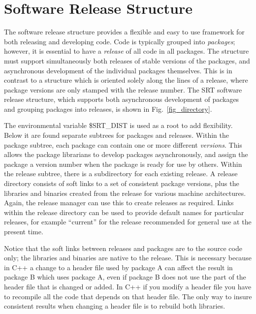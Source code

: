 \documentclass[12pt]{article}
\begin{document}
\section{Software Release Structure}
The software release structure provides a flexible and easy to use
framework for both releasing and developing code.  Code is typically grouped
into {\em packages}; however, it is essential to have a {\em release} of all 
code in 
all packages. The structure must support simultaneously both
releases of stable versions of the 
packages, and asynchronous development of 
the individual packages themselves.  This is in contrast to a structure which
is oriented solely along the lines of a release, where package versions
are only stamped with the release number. The SRT software release
structure, which supports both
asynchronous development of packages 
and grouping packages into releases,
is shown in Fig.~\ref{fig_directory}. 

The environmental variable {\ttfamily \$SRT\_DIST} is used as a root to add flexibility.  
Below it are found separate subtrees for packages and releases. 
Within the
package subtree, each package can contain one or more different {\em versions}.
This allows the package librarians to develop packages 
asynchronously,
and assign the package a version number when the package is ready for use
by others.  Within the release subtree, there is a subdirectory for each
existing release.  A release directory consists of soft links to a set of 
consistent package versions, plus the libraries and binaries created from
the release for various machine architectures.  Again, the release manager
can use this to create releases as required.  Links within the release
directory can be used to provide default names for particular releases, for
example ``current'' for the release recommended for general use at the present
time.

Notice that the soft links between releases and 
packages are
to the source code only; the libraries and binaries are native to the release.
This is necessary because in C++ a change to a header file used by package A can
affect the result in package B which uses package A, even if package B does 
not use the part of the header file that is changed or added.  In C++
if you modify a header file you have to recompile all the code that depends on 
that header file. The only way to insure consistent results when
changing a header file is to rebuild both libraries.  
\end{document}
